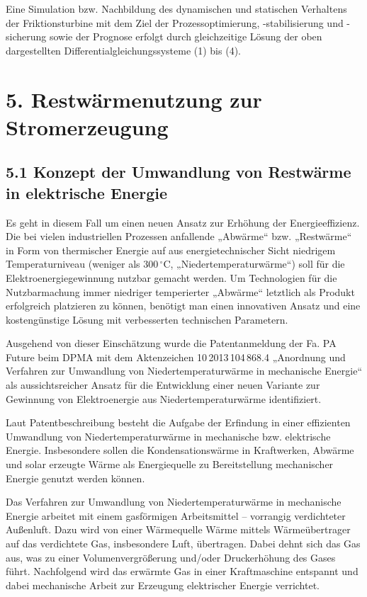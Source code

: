 \documentclass[11pt,a4paper]{article}
\begin{document}
Eine Simulation bzw. Nachbildung des dynamischen und statischen Verhaltens der
Friktionsturbine mit dem Ziel der Prozessoptimierung, -stabilisierung und
-sicherung sowie der Prognose erfolgt durch gleichzeitige Lösung der oben
dargestellten Differentialgleichungssysteme (1) bis (4).

\section*{5. Restwärmenutzung zur Stromerzeugung}

\subsection*{5.1 Konzept der Umwandlung von Restwärme in elektrische Energie}

Es geht in diesem Fall um einen neuen Ansatz zur Erhöhung der
Energieeffizienz. Die bei vielen industriellen Prozessen anfallende „Abwärme“
bzw. „Restwärme“ in Form von thermischer Energie auf aus energietechnischer
Sicht niedrigem Temperaturniveau (weniger als $300\,^\circ\mathrm{C}$,
„Niedertemperaturwärme“) soll für die Elektroenergiegewinnung nutzbar gemacht
werden. Um Technologien für die Nutzbarmachung immer niedriger temperierter
„Abwärme“ letztlich als Produkt erfolgreich platzieren zu können, benötigt man
einen innovativen Ansatz und eine kostengünstige Lösung mit verbesserten
technischen Parametern.

Ausgehend von dieser Einschätzung wurde die Patentanmeldung der Fa. PA Future
beim DPMA mit dem Aktenzeichen 10\,2013\,104\,868.4 „Anordnung und Verfahren zur
Umwandlung von Niedertemperaturwärme in mechanische Energie“ als
aussichtsreicher Ansatz für die Entwicklung einer neuen Variante zur Gewinnung
von Elektroenergie aus Niedertemperaturwärme identifiziert.

Laut Patentbeschreibung besteht die Aufgabe der Erfindung in einer effizienten
Umwandlung von Niedertemperaturwärme in mechanische bzw. elektrische
Energie. Insbesondere sollen die Kondensationswärme in Kraftwerken, Abwärme und
solar erzeugte Wärme als Energiequelle zu Bereitstellung mechanischer Energie
genutzt werden können.

Das Verfahren zur Umwandlung von Niedertemperaturwärme in mechanische Energie
arbeitet mit einem gasförmigen Arbeitsmittel – vorrangig verdichteter
Außenluft. Dazu wird von einer Wärmequelle Wärme mittels Wärmeübertrager auf
das verdichtete Gas, insbesondere Luft, übertragen. Dabei dehnt sich das Gas
aus, was zu einer Volumenvergrößerung und/oder Druckerhöhung des Gases
führt. Nachfolgend wird das erwärmte Gas in einer Kraftmaschine entspannt und
dabei mechanische Arbeit zur Erzeugung elektrischer Energie verrichtet.
\end{document}
